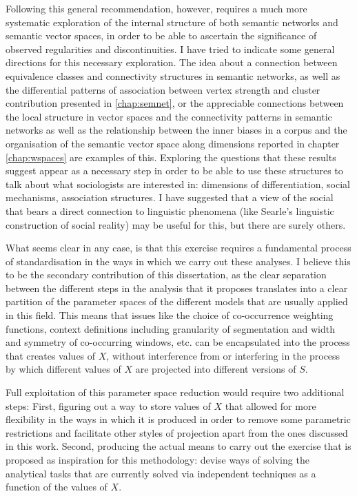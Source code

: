 Following this general recommendation, however, requires a much more systematic exploration of the internal structure of both semantic networks and semantic vector spaces, in order to be able to ascertain the significance of observed regularities and discontinuities.
I have tried to indicate some general directions for this necessary exploration.
The idea about a connection between equivalence classes and connectivity structures in semantic networks, as well as the differential patterns of association between vertex strength and cluster contribution presented in \autoref{chap:semnet}, or the appreciable connections between the local structure in vector spaces and the connectivity patterns in semantic networks as well as the relationship between the inner biases in a corpus and the organisation of the semantic vector space along dimensions reported in chapter \autoref{chap:wspaces} are examples of this.
Exploring the questions that these results suggest appear as a necessary step in order to be able to use these structures to talk about what sociologists are interested in: dimensions of differentiation, social mechanisms, association structures.
I have suggested that a view of the social that bears a direct connection to linguistic phenomena (like Searle's linguistic construction of social reality) may be useful for this, but there are surely others.

What seems clear in any case, is that this exercise requires a fundamental process of standardisation in the ways in which we carry out these analyses.
I believe this to be the secondary contribution of this dissertation, as the clear separation between the different steps in the analysis that it proposes translates into a clear partition of the parameter spaces of the different models that are usually applied in this field.
This means that issues like the choice of co-occurrence weighting functions, context definitions including granularity of segmentation and width and symmetry of co-occurring windows, etc. can be encapsulated into the process that creates values of $X$, without interference from or interfering in the process by which different values of $X$ are projected into different versions of $S$.

Full exploitation of this parameter space reduction would require two additional steps:
First, figuring out a way to store values of $X$ that allowed for more flexibility in the ways in which it is produced in order to remove some parametric restrictions and facilitate other styles of projection apart from the ones discussed in this work.
Second, producing the actual means to carry out the exercise that is proposed as inspiration for this methodology: devise ways of solving the analytical tasks that are currently solved via independent techniques as a function of the values of $X$.

